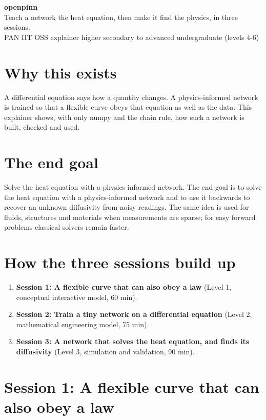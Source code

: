 \documentclass[11pt,a4paper]{article}
\begin{document}
\begin{center}{\LARGE\bfseries openpinn}\\[0.4em]{\large Teach a network the heat equation, then make it find the physics, in three sessions.}\\[0.2em]\small PAN IIT OSS explainer \textbullet{} higher secondary to advanced undergraduate (levels 4-6)\end{center}

\section*{Why this exists}
A differential equation says how a quantity changes. A physics-informed network is trained so that a flexible curve obeys that equation as well as the data. This explainer shows, with only numpy and the chain rule, how such a network is built, checked and used.

\section*{The end goal}
Solve the heat equation with a physics-informed network. The end goal is to solve the heat equation with a physics-informed network and to use it backwards to recover an unknown diffusivity from noisy readings. The same idea is used for fluids, structures and materials when measurements are sparse; for easy forward problems classical solvers remain faster.

\section*{How the three sessions build up}
\begin{enumerate}[nosep]
\item \textbf{Session 1: A flexible curve that can also obey a law} (Level 1, conceptual interactive model, 60 min).
\item \textbf{Session 2: Train a tiny network on a differential equation} (Level 2, mathematical engineering model, 75 min).
\item \textbf{Session 3: A network that solves the heat equation, and finds its diffusivity} (Level 3, simulation and validation, 90 min).
\end{enumerate}

\section{Session 1: A flexible curve that can also obey a law}
\end{document}
